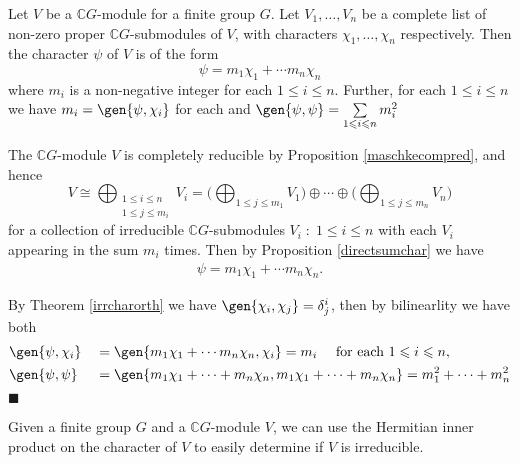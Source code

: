 \documentclass[../Project.tex]{subfiles}
\begin{document}
\begin{theo}[{\cite[Theorem 14.17]{2}}]
\label{intbasisforclassfun}
	Let $V$ be a $\mathbb{C}G$-module for a finite group $G$. Let $V_1,\dots,V_n$ be a complete list of non-zero proper $\mathbb{C}G$-submodules of $V$, with characters $\chi_1,\dots,\chi_n$ respectively. Then the character $\psi$ of $V$ is of the form 
	$$\psi = m_1\chi_1 + \cdots m_n\chi_n$$
	where $m_i$ is a non-negative integer for each $1 \leqslant i \leqslant n$. Further, for each $1 \leqslant i \leqslant n$ we have
	$m_i = \gen{\psi,\chi_i}$ for each and $\gen{\psi,\psi} = \sum\limits_{1 \leqslant i \leqslant n} m_i^2$ 
\end{theo}
\begin{proo*}[{\cite[page 141]{2}}]
	The $\mathbb{C}G$-module $V$ is completely reducible by Proposition \ref{maschkecompred}, and hence
	$$V \cong \bigoplus_{\substack{1 \leqslant i \leqslant n\\1 \leqslant j \leqslant m_i}}V_i = \Big({\bigoplus_{1 \leqslant j \leqslant m_1}V_1}\Big) \oplus \cdots \oplus \Big({\bigoplus_{1 \leqslant j \leqslant m_n}V_n}\Big)$$
	for a collection of irreducible $\mathbb{C}G$-submodules ${V_i\;:\;1\leqslant i \leqslant n}$ with each $V_i$ appearing in the sum $m_i$ times.
	Then by Proposition \ref{directsumchar} we have
	\begin{align*}
	\psi = m_1\chi_1 + \cdots m_n\chi_n.
	\end{align*}

	By Theorem \ref{irrcharorth} we have $\gen{\chi_i,\chi_j} = \delta^i_j$, then by bilinearlity we have both
	\begin{alignat*}{2}
	&\gen{\psi,\chi_i} &&= \gen{m_1\chi_1 + \cdots m_n\chi_n, \chi_i} =  m_i \quad \text{ for each } 1 \leqslant i \leqslant n,\\&\gen{\psi,\psi} &&= \gen{m_1\chi_1 + \cdots + m_n\chi_n,m_1\chi_1 + \cdots + m_n\chi_n} = m_1^2 + \cdots + m_n^2
	\end{alignat*}
	\hfill$\blacksquare$\\
\end{proo*}

Given a finite group $G$ and a $\mathbb{C}G$-module $V$, we can use the Hermitian inner product on the character of $V$ to easily determine if $V$ is  irreducible.
\end{document}
